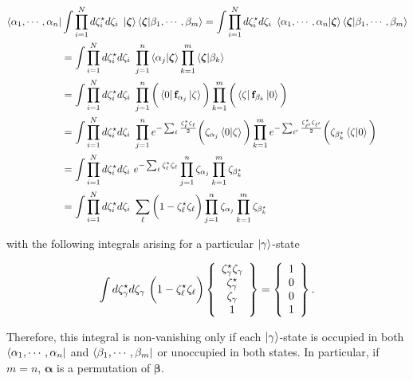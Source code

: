 \documentclass{homework}
\begin{document}
\begin{tcolorbox}[title = Fermionic closure relation]
\begin{equation}
    \begin{split}
        \bra{\alpha_1, \cdots, \alpha_n}& \int \prod_{i=1}^{N} d\zeta^\star_i d\zeta_i \textnormal{ } \ket{\bm{\zeta}}\bra{\bm{\zeta}} \ket{\beta_1, \cdots, \beta_m} = \int \prod_{i=1}^{N} d\zeta^\star_i d\zeta_i \textnormal{ } \bra{\alpha_1, \cdots, \alpha_n}\ket{\bm{\zeta}} \bra{\bm{\zeta}} \ket{\beta_1, \cdots, \beta_m}\\
        &= \int \prod_{i=1}^{N} d\zeta^\star_i d\zeta_i \textnormal{ } \prod_{j=1}^{n} \bra{\alpha_j}\ket{\bm{\zeta}} \prod_{k=1}^{m} \bra{\bm{\zeta}} \ket{\beta_k} \\
        &= \int \prod_{i=1}^{N} d\zeta^\star_i d\zeta_i \textnormal{ } \prod_{j=1}^{n} \bigg(\bra{0} {{\bf f}}_{\alpha_j} \ket{\zeta}\bigg) \prod_{k=1}^{m}\bigg(\bra{\zeta} {{\bf f}}_{\beta_k} \ket{0}\bigg) \\
        &= \int \prod_{i=1}^{N} d\zeta^\star_i d\zeta_i \textnormal{ } \prod_{j=1}^{n} e^{-\sum_{\ell} \frac{\zeta^\star_\ell\zeta_\ell}{2}} \bigg(\zeta_{\alpha_j} \bra{0}\ket{\zeta} \bigg) \prod_{k=1}^{m} e^{-\sum_{{\ell'}} \frac{\zeta^\star_{\ell'}\zeta_{\ell'}}{2}}\bigg(\zeta_{\beta_{k}^\star} \bra{\zeta} \ket{0}\bigg) \\
        &= \int \prod_{i=1}^{N} d\zeta^\star_i d\zeta_i \textnormal{ } e^{-\sum_{\ell} {\zeta^\star_\ell\zeta_\ell}} \prod_{j=1}^{n} \zeta_{\alpha_j} \prod_{k=1}^{m} \zeta_{\beta_{k}^\star} \\
        &= \int \prod_{i=1}^{N} d\zeta^\star_i d\zeta_i \textnormal{ } \sum_{\ell} \bigg(1-\zeta^\star_\ell\zeta_\ell \bigg)  \prod_{j=1}^{n} \zeta_{\alpha_j} \prod_{k=1}^{m} \zeta_{\beta_{k}^\star}
 \end{split}
\end{equation}

with the following integrals arising for a particular $\ket{\gamma}$-state

\begin{equation}
    \int d\zeta_{\gamma}^\star  d\zeta_{\gamma} \textnormal{ } \bigg(1- \zeta^\star_\ell\zeta_\ell \bigg) \left\{\begin{array}{c}
         \zeta_{\gamma}^\star \zeta_{\gamma} \\ \zeta_{\gamma}^\star \\
         \zeta_{\gamma} \\
         1
    \end{array}\right\} = \left\{\begin{array}{c}
         1  \\
         0  \\
         0  \\
         1
    \end{array}\right\}.
\end{equation}

Therefore, this integral is non-vanishing only if each $\ket{\gamma}$-state is occupied in both $\bra{\alpha_1, \cdots, \alpha_n}$ and $\bra{\beta_1, \cdots, \beta_m}$ or unoccupied in both states. In particular, if $m = n$, ${\bm \alpha}$ is a permutation of $\bm{\beta}$. 
\end{tcolorbox}
\end{document}
